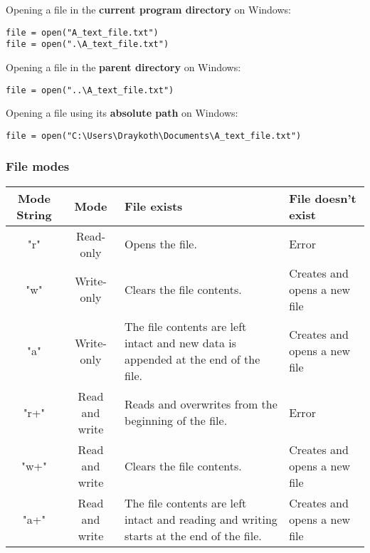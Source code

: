 \documentclass[11pt]{article}
\begin{document}
 \noindent Opening a file in the \textbf{current program directory} on Windows:
\begin{verbatim}
file = open("A_text_file.txt")
file = open(".\A_text_file.txt")
\end{verbatim}

 \noindent Opening a file in the \textbf{parent directory} on Windows:
\begin{verbatim}
file = open("..\A_text_file.txt")
\end{verbatim}

 \noindent Opening a file using its \textbf{absolute path} on Windows:
\begin{verbatim}
file = open("C:\Users\Draykoth\Documents\A_text_file.txt")
\end{verbatim}

\subsubsection{File modes}
\label{sec:orgf77bdac}
\begin{center}
\begin{tabular}{|c|c|m{10em}|m{10em}|}
\hline
Mode String & Mode & File exists & File doesn't exist\\[0pt]
\hline
"r" & Read-only & Opens the file. & Error\\[0pt]
\hline
"w" & Write-only & Clears the file contents. & Creates and opens a new file\\[0pt]
\hline
"a" & Write-only & The file contents are left intact and new data is appended at the end of the file. & Creates and opens a new file\\[0pt]
\hline
"r+" & Read and write & Reads and overwrites from the beginning of the file. & Error\\[0pt]
\hline
"w+" & Read and write & Clears the file contents. & Creates and opens a new file\\[0pt]
\hline
"a+" & Read and write & The file contents are left intact and reading and writing starts at the end of the file. & Creates and opens a new file\\[0pt]
\hline
\end{tabular}
\end{center}
\end{document}
